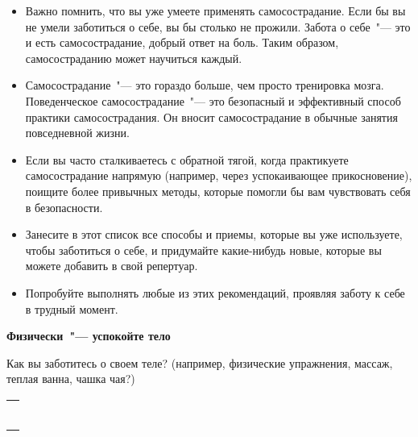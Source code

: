 \newpage
{}\label{IP:Self-Compassion_in_Daily_Life}
\begin{itemize}
	\item Важно помнить, что вы уже умеете применять самосострадание. Если бы вы не умели заботиться о себе, вы бы столько не прожили. Забота о себе~"--- это и есть самосострадание, добрый ответ на боль. Таким образом, самосостраданию может научиться каждый.
	
	\item Самосострадание~"--- это гораздо больше, чем просто тренировка мозга. Поведенческое самосострадание~"--- это безопасный и эффективный способ практики самосострадания. Он вносит самосострадание в обычные занятия повседневной жизни.
	
	\item Если вы часто сталкиваетесь с обратной тягой, когда практикуете самосострадание напрямую (например, через успокаивающее прикосновение), поищите более привычных методы, которые помогли бы вам чувствовать себя в безопасности.
	
	\item Занесите в этот список все способы и приемы, которые вы уже используете, чтобы заботиться о себе, и придумайте какие-нибудь новые, которые вы можете добавить в свой репертуар.
	
	\item Попробуйте выполнять любые из этих рекомендаций, проявляя заботу к себе в трудный момент.  
\end{itemize}

\vspace{5ex}

{\large \textbf{Физически~"--- успокойте тело}}

\begin{itemize}
	\itemWritingHand Как вы заботитесь о своем теле? (например, физические упражнения, массаж, теплая ванна, чашка чая?)
\end{itemize}

\setlength{\extrarowheight}{2mm}
\begin{tabularx}{0.96\textwidth}{X}
	\\
	\arrayrulecolor{gray}\hline\\
	\hline\\
	\hline\\
	\hline\\
	\hline\\
	\hline\\
	\hline\\
\end{tabularx}
\setlength{\extrarowheight}{0mm}

